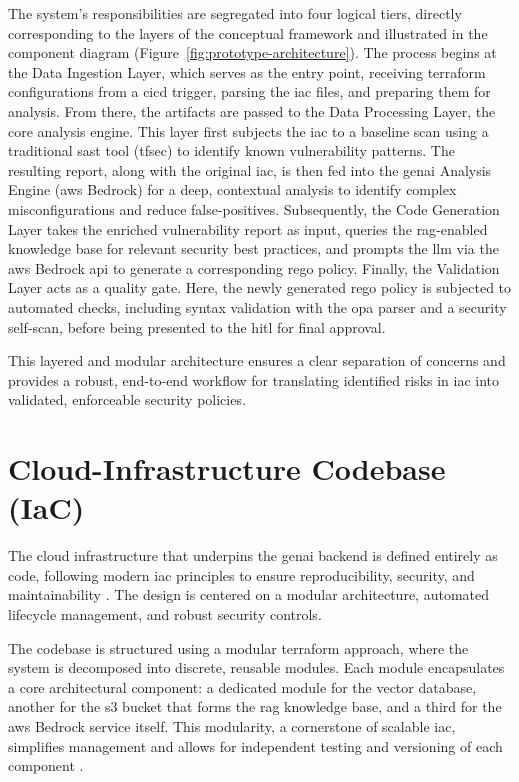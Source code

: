 The system's responsibilities are segregated into four logical tiers, directly corresponding to the layers of the conceptual framework and illustrated in the component diagram (Figure~\ref{fig:prototype-architecture}). The process begins at the Data Ingestion Layer, which serves as the entry point, receiving \gls{terraform} configurations from a \gls{cicd} trigger, parsing the \gls{iac} files, and preparing them for analysis. From there, the artifacts are passed to the Data Processing Layer, the core analysis engine. This layer first subjects the \gls{iac} to a baseline scan using a traditional \gls{sast} tool (tfsec) to identify known vulnerability patterns. The resulting report, along with the original \gls{iac}, is then fed into the \gls{genai} Analysis Engine (\gls{aws} Bedrock) for a deep, contextual analysis to identify complex misconfigurations and reduce \glspl{false-positive}. Subsequently, the Code Generation Layer takes the enriched vulnerability report as input, queries the \gls{rag}-enabled knowledge base for relevant security best practices, and prompts the \gls{llm} via the \gls{aws} Bedrock \gls{api} to generate a corresponding \gls{rego} policy. Finally, the Validation Layer acts as a quality gate. Here, the newly generated \gls{rego} policy is subjected to automated checks, including syntax validation with the \gls{opa} parser and a security self-scan, before being presented to the \gls{hitl} for final approval.

This layered and modular architecture ensures a clear separation of concerns and provides a robust, end-to-end workflow for translating identified risks in \gls{iac} into validated, enforceable security policies.

\section{Cloud-Infrastructure Codebase (IaC)}

The cloud infrastructure that underpins the \gls{genai} backend is defined entirely as code, following modern \gls{iac} principles to ensure reproducibility, security, and maintainability \cite{dasari_infrastructure_2025}. The design is centered on a modular architecture, automated lifecycle management, and robust security controls.

The codebase is structured using a modular \gls{terraform} approach, where the system is decomposed into discrete, reusable modules. Each module encapsulates a core architectural component: a dedicated module for the vector database, another for the \gls{s3} bucket that forms the \gls{rag} knowledge base, and a third for the \gls{aws} Bedrock service itself. This modularity, a cornerstone of scalable \gls{iac}, simplifies management and allows for independent testing and versioning of each component \cite{howard_terraform_2022}.

